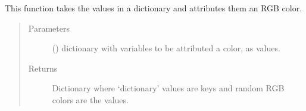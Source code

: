 \documentclass[letterpaper,10pt,english]{sphinxmanual}
\begin{document}

\begin{fulllineitems}
\label{\detokenize{_autosummary/report_manager.apps:report_manager.apps.imports.set_colors}}
This function takes the values in a dictionary and attributes them an RGB color.
\begin{quote}\begin{description}
\item[{Parameters}] \leavevmode
{} () \textendash{} dictionary with variables to be attributed a color, as values.

\item[{Returns}] \leavevmode
Dictionary where ‘dictionary’ values are keys and random RGB colors are the values.

\end{description}\end{quote}

\end{fulllineitems}

\end{document}

